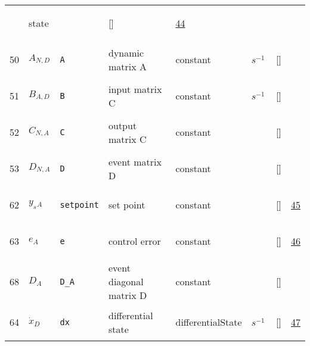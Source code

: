 \begin{longtable}{|p{1cm}|p{3cm}|p{3cm}|p{7cm}|p{3.0cm}|p{3cm}|p{2cm}|p{1cm}|}
             & \begin{lay}state \end{lay}
             & $  $
             & []
             & \hyperlink{"e:44"}{ 44 }
                 \\
    50
             & \hypertarget{"v:50"}{ $ {A}{_{N, D}} $}
             & \verb|A|
             & dynamic matrix A
             & \begin{lay}constant \end{lay}
             & $ s^{-1} \, $
             & []
             & \\
    51
             & \hypertarget{"v:51"}{ $ {B}{_{A, D}} $}
             & \verb|B|
             & input matrix C
             & \begin{lay}constant \end{lay}
             & $ s^{-1} \, $
             & []
             & \\
    52
             & \hypertarget{"v:52"}{ $ {C}{_{N, A}} $}
             & \verb|C|
             & output matrix C
             & \begin{lay}constant \end{lay}
             & $  $
             & []
             & \\
    53
             & \hypertarget{"v:53"}{ $ {D}{_{N, A}} $}
             & \verb|D|
             & event matrix D
             & \begin{lay}constant \end{lay}
             & $  $
             & []
             & \\
    62
             & \hypertarget{"v:62"}{ $ {{y_s}}{_{A}} $}
             & \verb|setpoint|
             & set point
             & \begin{lay}constant \end{lay}
             & $  $
             & []
             & \hyperlink{"e:45"}{ 45 }
                 \\
    63
             & \hypertarget{"v:63"}{ $ {e}{_{A}} $}
             & \verb|e|
             & control error
             & \begin{lay}constant \end{lay}
             & $  $
             & []
             & \hyperlink{"e:46"}{ 46 }
                 \\
    68
             & \hypertarget{"v:68"}{ $ {D}{_{A}} $}
             & \verb|D_A|
             & event diagonal matrix D
             & \begin{lay}constant \end{lay}
             & $  $
             & []
             & \\
    64
             & \hypertarget{"v:64"}{ $ {{\dot{x}}}{_{D}} $}
             & \verb|dx|
             & differential state
             & \begin{lay}differentialState \end{lay}
             & $ s^{-1} \, $
             & []
             & \hyperlink{"e:47"}{ 47 }
                 \\
    \end{longtable}